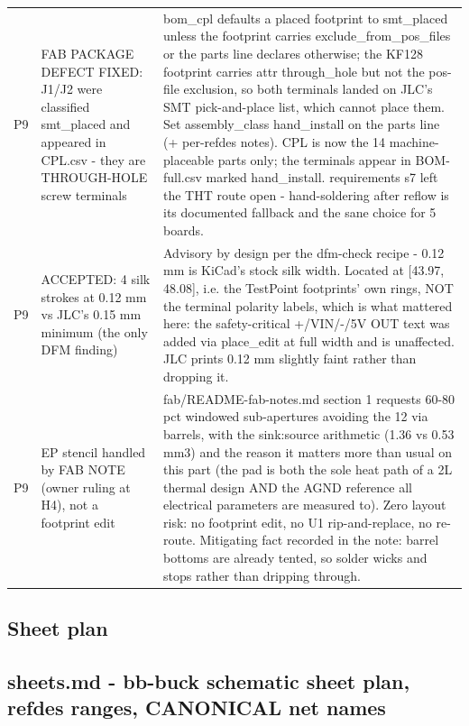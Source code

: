 \documentclass[11pt,a4paper]{article}
\begin{document}
{\begin{longtable}{lp{5.2cm}p{7.2cm}}
P9 & FAB PACKAGE DEFECT FIXED: J1/J2 were classified smt\_placed and appeared in CPL.csv - they are THROUGH-HOLE screw terminals & bom\_cpl defaults a placed footprint to smt\_placed unless the footprint carries exclude\_from\_pos\_files or the parts line declares otherwise; the KF128 footprint carries attr through\_hole but not the pos-file exclusion, so both terminals landed on JLC's SMT pick-and-place list, which cannot place them. Set assembly\_class hand\_install on the parts line (+ per-refdes notes). CPL is now the 14 machine-placeable parts only; the terminals appear in BOM-full.csv marked hand\_install. requirements s7 left the THT route open - hand-soldering after reflow is its documented fallback and the sane choice for 5 boards. \\
P9 & ACCEPTED: 4 silk strokes at 0.12 mm vs JLC's 0.15 mm minimum (the only DFM finding) & Advisory by design per the dfm-check recipe - 0.12 mm is KiCad's stock silk width. Located at {[}43.97, 48.08{]}, i.e. the TestPoint footprints' own rings, NOT the terminal polarity labels, which is what mattered here: the safety-critical +/VIN/-/5V OUT text was added via place\_edit at full width and is unaffected. JLC prints 0.12 mm slightly faint rather than dropping it. \\
P9 & EP stencil handled by FAB NOTE (owner ruling at H4), not a footprint edit & fab/README-fab-notes.md section 1 requests 60-80 pct windowed sub-apertures avoiding the 12 via barrels, with the sink:source arithmetic (1.36 vs 0.53 mm3) and the reason it matters more than usual on this part (the pad is both the sole heat path of a 2L thermal design AND the AGND reference all electrical parameters are measured to). Zero layout risk: no footprint edit, no U1 rip-and-replace, no re-route. Mitigating fact recorded in the note: barrel bottoms are already tented, so solder wicks and stops rather than dripping through. \\
\bottomrule
\end{longtable}
}
\subsection*{Sheet plan}
\subsection*{sheets.md - bb-buck schematic sheet plan, refdes ranges, CANONICAL net names}
\end{document}
